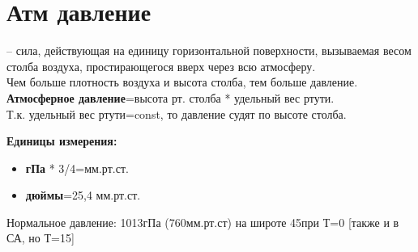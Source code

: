 
\section{Атм давление}
– сила, действующая на единицу горизонтальной поверхности, вызываемая весом столба воздуха, простирающегося вверх через всю атмосферу.\\
Чем больше плотность воздуха и высота столба, тем больше давление.\\
\textbf{Атмосферное давление}=высота рт. столба * удельный вес ртути. \\
Т.к. удельный вес ртути=const, то давление судят по высоте столба.
\par \textbf{Единицы измерения:}
\begin{itemize}
	\item[] \textbf{гПа} * 3/4=мм.рт.ст.
	\item[] \textbf{дюймы}=25,4 мм.рт.ст.
\end{itemize}
Нормальное давление: 1013гПа (760мм.рт.ст) на широте 45\textdegree при Т=0 [также и в СА, но Т=15]
